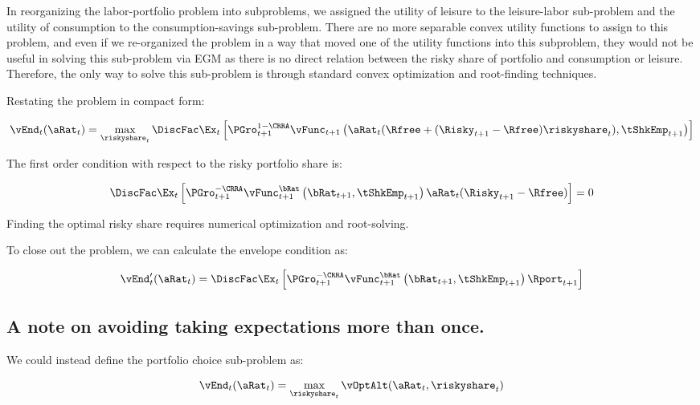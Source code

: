 \documentclass[\econtexRoot/EGMN]{subfiles}
\begin{document}
In reorganizing the labor-portfolio problem into subproblems, we assigned the utility of leisure to the leisure-labor sub-problem and the utility of consumption to the consumption-savings sub-problem. There are no more separable convex utility functions to assign to this problem, and even if we re-organized the problem in a way that moved one of the utility functions into this subproblem, they would not be useful in solving this sub-problem via EGM as there is no direct relation between the risky share of portfolio and consumption or leisure. Therefore, the only way to solve this sub-problem is through standard convex optimization and root-finding techniques.

Restating the problem in compact form:

\begin{equation}
  \vEnd_{t}(\aRat_{t}) = \max_{\riskyshare_{t}} \DiscFac \Ex_{t} \left[ \PGro_{t+1}^{1-\CRRA}
  \vFunc_{t+1}\left(\aRat_{t}(\Rfree + (\Risky_{t+1} - \Rfree) \riskyshare_{t}), \tShkEmp_{t+1}\right)
  \right]
\end{equation}

The first order condition with respect to the risky portfolio share is:

\begin{equation}
  \DiscFac \Ex_{t} \left[ \PGro_{t+1}^{-\CRRA} \vFunc_{t+1}^{\bRat}\left(\bRat_{t+1}, \tShkEmp_{t+1}\right) \aRat_{t}(\Risky_{t+1} - \Rfree)  \right] = 0
\end{equation}

Finding the optimal risky share requires numerical optimization and root-solving.

To close out the problem, we can calculate the envelope condition as:

\begin{equation}
  \vEnd_{t}'(\aRat_{t}) = \DiscFac \Ex_{t} \left[ \PGro_{t+1}^{-\CRRA} \vFunc_{t+1}^{\bRat}\left(\bRat_{t+1}, \tShkEmp_{t+1}\right) \Rport_{t+1}  \right]
\end{equation}

\subsection{A note on avoiding taking expectations more than once.}

We could instead define the portfolio choice sub-problem as:

\begin{equation}
  \vEnd_{t}(\aRat_{t}) = \max_{\riskyshare_{t}} \vOptAlt(\aRat_{t}, \riskyshare_{t})
\end{equation}
\end{document}

